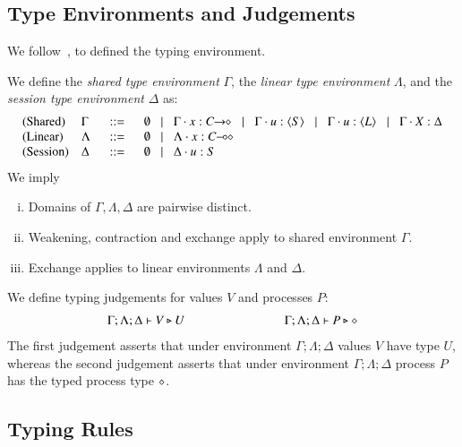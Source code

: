 \subsection{Type Environments and Judgements}
We follow~\cite{tlca07},
to defined the typing environment.
%
\begin{definition}\rm\label{def:typeenv}
	We define the {\em shared type environment} $\Gamma$,
	the {\em linear type environment} $\Lambda$, and
	the {\em session type environment} $\Delta$ as:
	\[
	\begin{array}{llcl}
		\text{(Shared)}		& \Gamma  & \bnfis &	\emptyset \bnfbar \Gamma \cat x: \shot{C} \bnfbar \Gamma \cat u: \chtype{S} \bnfbar
								\Gamma \cat u: \chtype{L} \bnfbar \Gamma \cat \varp{X}: \Delta
		\\
		\text{(Linear)}		& \Lambda & \bnfis &	\emptyset \bnfbar \Lambda \cat x: \lhot{C}
		\\
		\text{(Session)}	& \Delta  & \bnfis &	\emptyset \bnfbar \Delta \cat u:S
	\end{array}
	\]
	We imply
	\begin{enumerate}[i.]
		\item	Domains of $\Gamma, \Lambda, \Delta$ are pairwise distinct.
		\item	Weakening, contraction and exchange apply to shared environment $\Gamma$.
		\item	Exchange applies to linear environments $\Lambda$ and $\Delta$. 
	\end{enumerate}
\end{definition}
%
\noi We define typing judgements for values $V$
and processes $P$:
%
\[	\begin{array}{c}
		\Gamma; \Lambda; \Delta \vdash V \triangleright U \qquad \qquad \qquad \qquad \Gamma; \Lambda; \Delta \vdash P \triangleright \diamond
	\end{array}
\]
%
\noi The first judgement asserts that under environment $\Gamma; \Lambda; \Delta$
values $V$ have type $U$,
whereas the second judgement asserts that under environment $\Gamma; \Lambda; \Delta$
process $P$ has the typed process type $\diamond$.


\subsection{Typing Rules}



